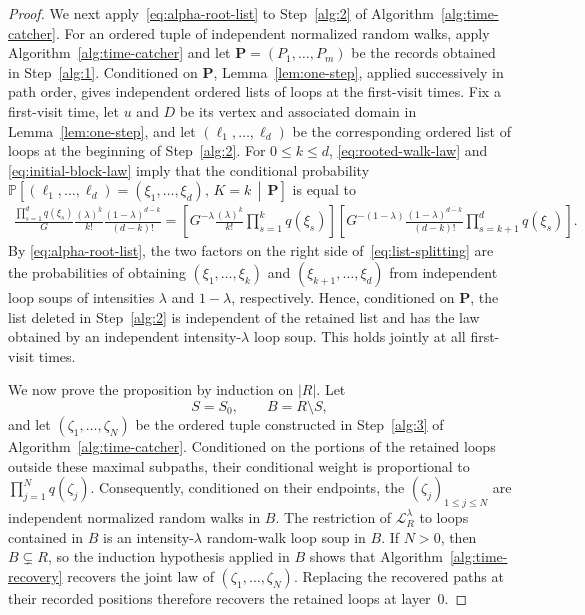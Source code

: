 \documentclass[11pt]{article}
\numberwithin{equation}{section}
\newcommand{\1}{\mathbf{1}}
\newcommand{\Prob}{\mathbb P}
\newcommand{\Lc}{\mathcal L}
\begin{document}
\begin{proof}
We next apply~\eqref{eq:alpha-root-list} to Step~\ref{alg:2} of
Algorithm~\ref{alg:time-catcher}.  For an ordered tuple of independent normalized random walks, apply Algorithm~\ref{alg:time-catcher} and let $\boldsymbol P=(P_1,\ldots,P_m)$
be the records obtained in Step~\ref{alg:1}.  Conditioned on
$\boldsymbol P$, Lemma~\ref{lem:one-step}, applied successively in path
order, gives independent ordered lists of loops at the first-visit times.
Fix a first-visit time, let $u$ and $D$ be its vertex and associated domain
in Lemma~\ref{lem:one-step}, and let $(\ell_1,\ldots,\ell_d)$
be the corresponding ordered list of loops at the beginning of Step~\ref{alg:2}.  For
$0\le k\le d$, \eqref{eq:rooted-walk-law} and
\eqref{eq:initial-block-law} imply that the conditional probability $\Prob\!\left[
   (\ell_1,\ldots,\ell_d)=(\xi_1,\ldots,\xi_d),\,K=k
   \,\middle|\,\boldsymbol P
 \right]$ is equal to
\begin{align}\label{eq:list-splitting}
 \frac{\prod_{s=1}^d q(\xi_s)}{G}
 \frac{(\lambda)^{\overline k}}{k!}
 \frac{(1-\lambda)^{\overline{d-k}}}{(d-k)!}=
 \left[
  G^{-\lambda}
  \frac{(\lambda)^{\overline k}}{k!}
  \prod_{s=1}^k q(\xi_s)
 \right]
 \left[
  G^{-(1-\lambda)}
  \frac{(1-\lambda)^{\overline{d-k}}}{(d-k)!}
  \prod_{s=k+1}^d q(\xi_s)
 \right].
\end{align}
By \eqref{eq:alpha-root-list}, the two factors on the right side of~\eqref{eq:list-splitting} are the probabilities of obtaining $(\xi_1,\ldots,\xi_k)$ and $(\xi_{k+1},\ldots,\xi_d)$
from independent loop soups of intensities $\lambda$ and $1-\lambda$,
respectively.  Hence, conditioned on $\boldsymbol P$, the list deleted in
Step~\ref{alg:2} is independent of the retained list and has the law
obtained by an independent intensity-$\lambda$ loop soup.  This holds
jointly at all first-visit times.

We now prove the proposition by induction on $|R|$.  Let
\[
 S=S_0,\qquad B=R\setminus S,
\]
and let $(\zeta_1,\ldots,\zeta_N)$ be the ordered tuple constructed in
Step~\ref{alg:3} of Algorithm~\ref{alg:time-catcher}.  Conditioned on the
portions of the retained loops outside these maximal subpaths, their
conditional weight is proportional to $\prod_{j=1}^N q(\zeta_j)$.
Consequently, conditioned on their endpoints, the $(\zeta_j)_{1\le j\le N}$ are independent
normalized random walks in $B$.
The restriction of $\Lc_R^\lambda$ to loops contained in $B$ is an
intensity-$\lambda$ random-walk loop soup in $B$. If $N>0$, then
$B\subsetneq R$, so the induction hypothesis applied in $B$ shows that Algorithm~\ref{alg:time-recovery} recovers the joint
law of $(\zeta_1,\ldots,\zeta_N)$.  Replacing the recovered paths at their
recorded positions therefore recovers the retained loops at layer~$0$.



\end{proof}
\end{document}
